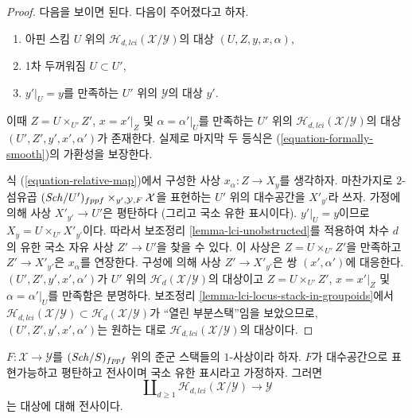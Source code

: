 \begin{proof}
다음을 보이면 된다. 다음이 주어졌다고 하자.
\begin{enumerate}
\item 아핀 스킴 $U$ 위의 $\mathcal{H}_{d, lci}(\mathcal{X}/\mathcal{Y})$의
대상 $(U, Z, y, x, \alpha)$,
\item 1차 두꺼워짐 $U \subset U'$,
\item $y'|_U = y$를 만족하는 $U'$ 위의 $\mathcal{Y}$의 대상 $y'$.
\end{enumerate}
이때 $Z = U \times_{U'} Z'$, $x = x'|_Z$ 및
$\alpha = \alpha'|_U$를 만족하는 $U'$ 위의
$\mathcal{H}_{d, lci}(\mathcal{X}/\mathcal{Y})$의 대상
$(U', Z', y', x', \alpha')$가 존재한다. 실제로 마지막 두 등식은
(\ref{equation-formally-smooth})의 가환성을 보장한다.

\medskip\noindent
식 (\ref{equation-relative-map})에서 구성한 사상
$x_\alpha : Z \to X_y$를 생각하자. 마찬가지로 $2$-섬유곱
$(\mathit{Sch}/U')_{fppf} \times_{y', \mathcal{Y}, F} \mathcal{X}$을 표현하는
$U'$ 위의 대수공간을
$X'_{y'}$라 쓰자. 가정에 의해 사상 $X'_{y'} \to U'$은 평탄하다
(그리고 국소 유한 표시이다). $y'|_U = y$이므로
$X_y = U \times_{U'} X'_{y'}$이다. 따라서 보조정리
\ref{lemma-lci-unobstructed}를 적용하여 차수 $d$의 유한 국소 자유 사상
$Z' \to U'$을 찾을 수 있다. 이 사상은 $Z = U \times_{U'} Z'$을
만족하고 $Z' \to X'_{y'}$은 $x_\alpha$를 연장한다. 구성에 의해 사상
$Z' \to X'_{y'}$은 쌍 $(x', \alpha')$에 대응한다.
$(U', Z', y', x', \alpha')$가 $U'$ 위의
$\mathcal{H}_d(\mathcal{X}/\mathcal{Y})$의 대상이고
$Z = U \times_{U'} Z'$, $x = x'|_Z$ 및 $\alpha = \alpha'|_U$를
만족함은 분명하다. 보조정리
\ref{lemma-lci-locus-stack-in-groupoids}에서
$\mathcal{H}_{d, lci}(\mathcal{X}/\mathcal{Y}) \subset
\mathcal{H}_d(\mathcal{X}/\mathcal{Y})$가 ``열린 부분스택''임을 보았으므로,
$(U', Z', y', x', \alpha')$는 원하는 대로
$\mathcal{H}_{d, lci}(\mathcal{X}/\mathcal{Y})$의 대상이다.
\end{proof}

\begin{lemma}
\label{lemma-lci-surjective}
$F : \mathcal{X} \to \mathcal{Y}$를 $(\mathit{Sch}/S)_{fppf}$ 위의 준군
스택들의 $1$-사상이라 하자. $F$가 대수공간으로 표현가능하고
평탄하고 전사이며 국소 유한 표시라고 가정하자. 그러면
$$
\coprod\nolimits_{d \geq 1} \mathcal{H}_{d, lci}(\mathcal{X}/\mathcal{Y})
\longrightarrow
\mathcal{Y}
$$
는 대상에 대해 전사이다.
\end{lemma}

